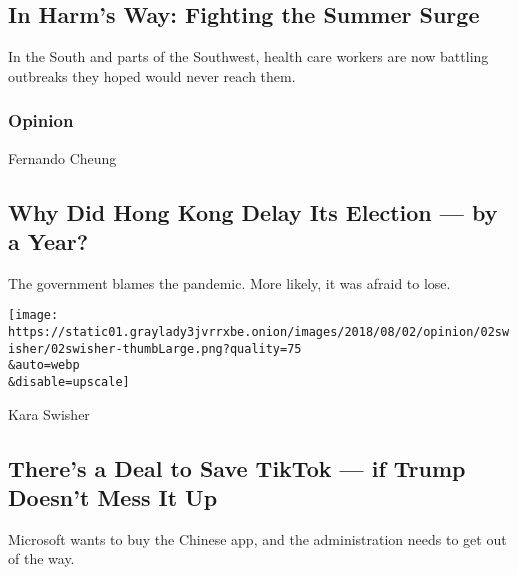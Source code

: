 \href{/interactive/2020/world/coronavirus-health-care-workers.html}{}

\hypertarget{in-harms-way-fighting-the-summer-surge}{%
\subsection{In Harm's Way: Fighting the Summer
Surge}\label{in-harms-way-fighting-the-summer-surge}}

In the South and parts of the Southwest, health care workers are now
battling outbreaks they hoped would never reach them.

\href{https://www.nytimes3xbfgragh.onion/section/opinion?pagetype=Homepage\&action=click\&module=Opinion}{}

\hypertarget{opinion}{%
\subsubsection{Opinion}\label{opinion}}

\href{/2020/08/02/opinion/hong-kong-election-china.html}{}

Fernando Cheung

\hypertarget{why-did-hong-kong-delay-its-election--by-a-year}{%
\subsection{Why Did Hong Kong Delay Its Election --- by a
Year?}\label{why-did-hong-kong-delay-its-election--by-a-year}}

The government blames the pandemic. More likely, it was afraid to lose.

\href{/2020/08/02/opinion/02tik-tok-china-trump.html}{}

\texttt{[image: https://static01.graylady3jvrrxbe.onion/images/2018/08/02/opinion/02swisher/02swisher-thumbLarge.png?quality=75\\\&auto=webp\\\&disable=upscale]}

Kara Swisher

\hypertarget{theres-a-deal-to-save-tiktok--if-trump-doesnt-mess-it-up}{%
\subsection{There's a Deal to Save TikTok --- if Trump Doesn't Mess It
Up}\label{theres-a-deal-to-save-tiktok--if-trump-doesnt-mess-it-up}}

Microsoft wants to buy the Chinese app, and the administration needs to
get out of the way.

\href{/2020/08/02/opinion/02tik-tok-china-trump.html}{}

